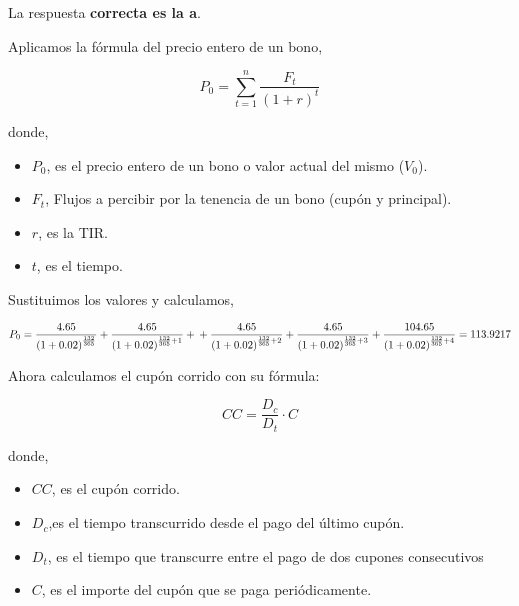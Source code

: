 \documentclass[
  letterpaper,
  DIV=11,
  numbers=noendperiod]{scrreprt}
\begin{document}
\begin{tcolorbox}[enhanced jigsaw, left=2mm, opacityback=0, colback=white, breakable, arc=.35mm, bottomrule=.15mm, rightrule=.15mm, toprule=.15mm, leftrule=.75mm, colframe=quarto-callout-tip-color-frame]
\begin{minipage}[t]{5.5mm}
\textcolor{quarto-callout-tip-color}{\faLightbulb}
\end{minipage}%
\begin{minipage}[t]{\textwidth - 5.5mm}

La respuesta \textbf{correcta es la a}.

Aplicamos la fórmula del precio entero de un bono,

\[P_0=\sum_{ t=1}^{ n}\frac{F_t}{(1+r)^{t}}\]

donde,

\begin{itemize}
\item
  \(P_0\), es el precio entero de un bono o valor actual del mismo
  (\(V_0\)).
\item
  \(F_t\), Flujos a percibir por la tenencia de un bono (cupón y
  principal).
\item
  \(r\), es la TIR.
\item
  \(t\), es el tiempo.
\end{itemize}

Sustituimos los valores y calculamos,

\[P_0=\frac{4.65}{\left(1+0.02\right)^{\frac{132}{365}}}+
\frac{4.65}{\left(1+0.02\right)^{\frac{132}{365}+1}}+\\
+\frac{4.65}{\left(1+0.02\right)^{\frac{132}{365}+2}}+\frac{4.65}{\left(1+0.02\right)^{\frac{132}{365}+3}}+\frac{104.65}{\left(1+0.02\right)^{\frac{132}{365}+4}}=113.9217\]

Ahora calculamos el cupón corrido con su fórmula:

\[CC=\frac{D_c}{D_t}\cdot C\]

donde,

\begin{itemize}
\item
  \(CC\), es el cupón corrido.
\item
  \(D_{c}\),es el tiempo transcurrido desde el pago del último cupón.
\item
  \(D_{t}\), es el tiempo que transcurre entre el pago de dos cupones
  consecutivos
\item
  \(C\), es el importe del cupón que se paga periódicamente.
\end{itemize}


\end{minipage}
\end{tcolorbox}
\end{document}
